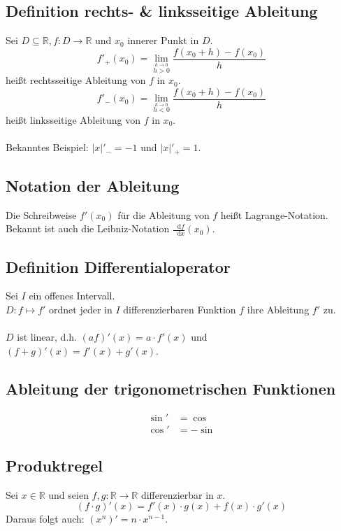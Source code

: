 \documentclass[halfparscip]{scrartcl}
\newcommand*\dif{\mathop{}\!\mathrm{d}}
\newcounter{subsection2}
\begin{document}
\subsection{Definition rechts- \& linksseitige Ableitung}
Sei $D \subseteq \mathbb{R}, f: D \rightarrow \mathbb{R}$ und $x_0$ innerer Punkt in $D$.\\
\begin{equation*}
	f'_+(x_0) = \lim_{\stackrel{h\rightarrow 0}{h > 0}}\frac{f(x_0 + h) - f(x_0)}{h}
\end{equation*}
heißt rechtsseitige Ableitung von $f$ in $x_0$.
\begin{equation*}
f'_-(x_0) = \lim_{\stackrel{h\rightarrow 0}{h < 0}}\frac{f(x_0 + h) - f(x_0)}{h}
\end{equation*}
heißt linksseitige Ableitung von $f$ in $x_0$.\\\\
Bekanntes Beispiel: $|x|'_-=-1$ und $|x|'_+=1$.

\subsection*{Notation der Ableitung}
Die Schreibweise $f'(x_0)$ für die Ableitung von $f$ heißt Lagrange-Notation. Bekannt ist auch die Leibniz-Notation $\frac{\dif f}{\dif x}(x_0)$.

\subsection*{Definition Differentialoperator}
Sei $I$ ein offenes Intervall.\\
$D: f \mapsto f'$ ordnet jeder in $I$ differenzierbaren Funktion $f$ ihre Ableitung $f'$ zu.\\\\
$D$ ist linear, d.h. $(a f)'(x) = a \cdot f'(x)$ und $(f + g)'(x) = f'(x) + g'(x)$.

\subsection*{Ableitung der trigonometrischen Funktionen}
\begin{align*}
	\sin' &= \cos\\
	\cos' &= -\sin
\end{align*}

\addtocounter{subsection}{4}
\subsection{Produktregel}
Sei $x \in \mathbb{R}$ und seien $f, g: \mathbb{R} \rightarrow \mathbb{R}$ differenzierbar in $x$.\\
\begin{equation*}
	(f \cdot g)'(x) = f'(x)\cdot g(x) + f(x)\cdot g'(x)
\end{equation*}
Daraus folgt auch: $(x^n)' = n \cdot x^{n-1}$.
\end{document}
